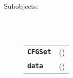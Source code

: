 \begin{description}
  \item[Subobjects:] \hfill \\
\ 
    \begin{tabular}{ll}
      \texttt{\textbf{CFGSet}} & (\Jref{module}{CFGSet}) \\
      \texttt{\textbf{data}} & (\Jref{module}{CFGSet}) \\
    \end{tabular}
\vspace{3mm}

\end{description}

